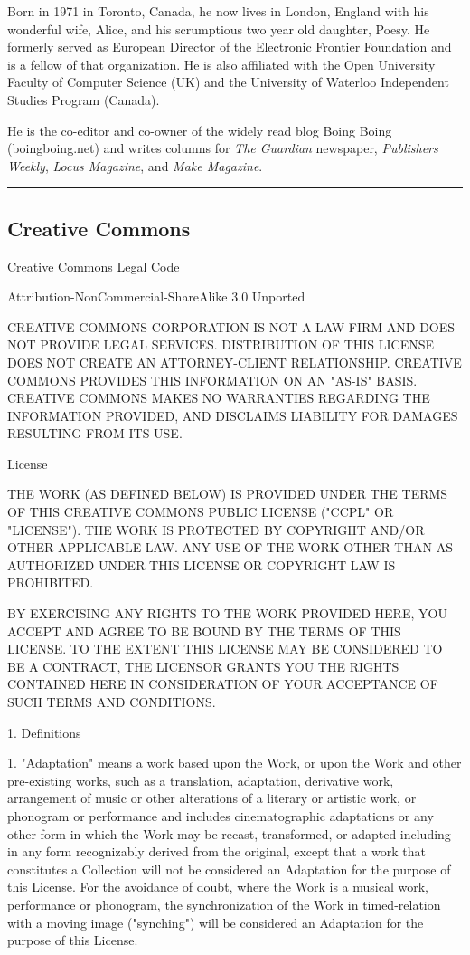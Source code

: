 Born in 1971 in Toronto, Canada, he now lives in London, England
with his wonderful wife, Alice, and his scrumptious two year old
daughter, Poesy. He formerly served as European Director of the
Electronic Frontier Foundation and is a fellow of that
organization. He is also affiliated with the Open University
Faculty of Computer Science (UK) and the University of Waterloo
Independent Studies Program (Canada).

He is the co-editor and co-owner of the widely read blog Boing
Boing (boingboing.net) and writes columns for \emph{The Guardian}
newspaper, \emph{Publishers Weekly}, \emph{Locus Magazine}, and
\emph{Make Magazine}.

\begin{center}\rule{3in}{0.4pt}\end{center}

\subsection{Creative Commons}

Creative Commons Legal Code

Attribution-NonCommercial-ShareAlike 3.0 Unported

CREATIVE COMMONS CORPORATION IS NOT A LAW FIRM AND DOES NOT PROVIDE
LEGAL SERVICES. DISTRIBUTION OF THIS LICENSE DOES NOT CREATE AN
ATTORNEY-CLIENT RELATIONSHIP. CREATIVE COMMONS PROVIDES THIS
INFORMATION ON AN "AS-IS" BASIS. CREATIVE COMMONS MAKES NO
WARRANTIES REGARDING THE INFORMATION PROVIDED, AND DISCLAIMS
LIABILITY FOR DAMAGES RESULTING FROM ITS USE.

License

THE WORK (AS DEFINED BELOW) IS PROVIDED UNDER THE TERMS OF THIS
CREATIVE COMMONS PUBLIC LICENSE ("CCPL" OR "LICENSE"). THE WORK IS
PROTECTED BY COPYRIGHT AND/OR OTHER APPLICABLE LAW. ANY USE OF THE
WORK OTHER THAN AS AUTHORIZED UNDER THIS LICENSE OR COPYRIGHT LAW
IS PROHIBITED.

BY EXERCISING ANY RIGHTS TO THE WORK PROVIDED HERE, YOU ACCEPT AND
AGREE TO BE BOUND BY THE TERMS OF THIS LICENSE. TO THE EXTENT THIS
LICENSE MAY BE CONSIDERED TO BE A CONTRACT, THE LICENSOR GRANTS YOU
THE RIGHTS CONTAINED HERE IN CONSIDERATION OF YOUR ACCEPTANCE OF
SUCH TERMS AND CONDITIONS.

1. Definitions

1. "Adaptation" means a work based upon the Work, or upon the Work
and other pre-existing works, such as a translation, adaptation,
derivative work, arrangement of music or other alterations of a
literary or artistic work, or phonogram or performance and includes
cinematographic adaptations or any other form in which the Work may
be recast, transformed, or adapted including in any form
recognizably derived from the original, except that a work that
constitutes a Collection will not be considered an Adaptation for
the purpose of this License. For the avoidance of doubt, where the
Work is a musical work, performance or phonogram, the
synchronization of the Work in timed-relation with a moving image
("synching") will be considered an Adaptation for the purpose of
this License.


